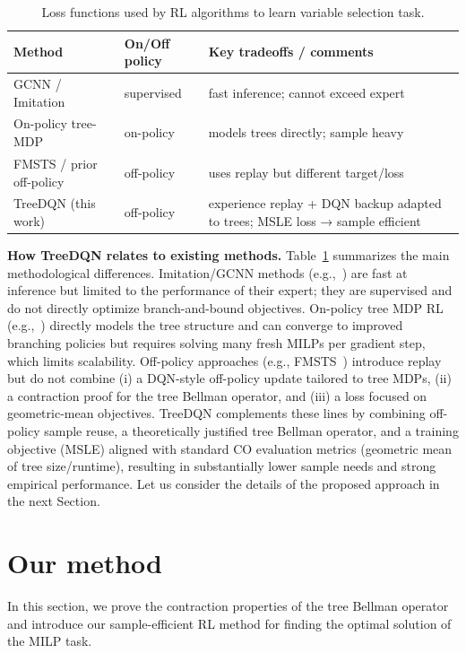 \documentclass[preprint,12pt]{elsarticle} %
\theoremstyle{plain}
\theoremstyle{definition}
\theoremstyle{remark}
\begin{document}
\begin{table}[t]
\caption{Loss functions used by RL algorithms to learn variable selection task.}\label{tab:diff_related}
\begin{center}
\footnotesize
\begin{tabular}{llp{}}
    \hline
    Method	& On/Off policy	& Key tradeoffs / comments  \\
    \hline
    
GCNN / Imitation~\cite{gasse_2019} & supervised	& fast inference; cannot exceed expert \\
On-policy tree-MDP~\cite{scavuzzo_2022} &	on-policy& models trees directly; sample heavy \\
FMSTS / prior off-policy~\cite{etheve_2020} &	off-policy	& uses replay but different target/loss \\
TreeDQN (this work)	& off-policy & experience replay + DQN backup adapted to trees; %
MSLE loss → sample efficient \\
    \hline
    \end{tabular}
\end{center}
\end{table}


\textbf{How TreeDQN relates to existing methods.} Table~\ref{tab:diff_related} summarizes the main methodological differences. Imitation/GCNN methods (e.g.,~\cite{gasse_2019}) are fast at inference but limited to the performance of their expert; they are supervised and do not directly optimize branch-and-bound objectives. On-policy tree MDP RL (e.g.,~\cite{scavuzzo_2022}) directly models the tree structure and can converge to improved branching policies but requires solving many fresh MILPs per gradient step, which limits scalability. Off-policy approaches (e.g., FMSTS~\cite{etheve_2020}) introduce replay but do not combine (i) a DQN-style off-policy update tailored to tree MDPs, (ii) a contraction proof for the tree Bellman operator, and (iii) a loss focused on geometric-mean objectives. TreeDQN complements these lines by combining off-policy sample reuse, a theoretically justified tree Bellman operator, and a training objective (MSLE) aligned with standard CO evaluation metrics (geometric mean of tree size/runtime), resulting in substantially lower sample needs and strong empirical performance. Let us consider the details of the proposed approach in the next Section.

\section{Our method}\label{sec:proposed}
In this section, we prove the contraction properties of the tree Bellman operator and introduce our sample-efficient RL method for finding the optimal solution of the MILP task.
\end{document}
